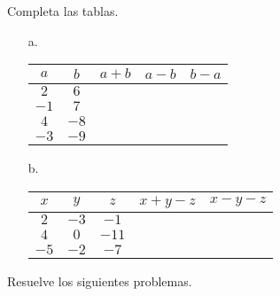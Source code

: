 \documentclass[spanish,letterpaper, 11pt, addpoints, answers]{exam}
\begin{document}
\begin{questions}
\begin{multicols}{2}
\begin{itemize}
\end{itemize}

\end{multicols}

\question Completa las tablas.

\begin{itemize}
  \item[a.]
\begin{center}
  \begin{tabular}{|c|c|>{\centering\arraybackslash}p{2.5cm}|>{\centering\arraybackslash}p{2.5cm}|>{\centering\arraybackslash}p{2.5cm}|}\hline
    $a$ & $b$ & $a+b$ & $a-b$ & $b-a$ \\ \hline
    $2$ & $6$ &&& \\ \hline
    $-1$ & $7$ &&& \\ \hline
    $4$ & $-8$ &&& \\ \hline
    $-3$ & $-9$ &&& \\ \hline
  \end{tabular}
\end{center}
\vspace{0.5cm}
\item[b.]
\begin{center}
  \begin{tabular}{|c|c|c|>{\centering\arraybackslash}p{3.5cm}|>{\centering\arraybackslash}p{3.5cm}|}\hline
  $x$&$y$&$z$&$x+y-z$&$x-y-z$\\ \hline
  $2$&$-3$&$-1$&&\\ \hline
  $4$&$0$&$-11$&&\\ \hline
  $-5$&$-2$&$-7$&&\\ \hline
  
    
  \end{tabular}
\end{center}
\end{itemize}

\question Resuelve los siguientes problemas.


\end{questions}
\end{document}
